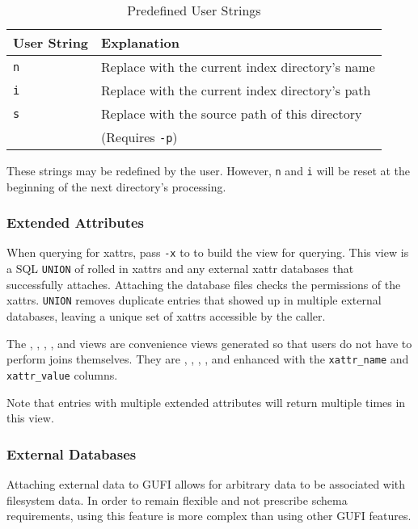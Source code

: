 \begin{table}[H]
  \centering
  \begin{tabular}{|l|l|}
    \hline
    User String & Explanation \\
    \hline
    \texttt{n} & Replace with the current index directory's name \\
    \hline
    \texttt{i} & Replace with the current index directory's path \\
    \hline
    \texttt{s} & Replace with the source path of this directory \\
               & (Requires \texttt{-p}) \\
    \hline
  \end{tabular}
  \caption{Predefined User Strings}
\end{table}

These strings may be redefined by the user. However, \texttt{n} and
\texttt{i} will be reset at the beginning of the next directory's
processing.

\subsubsection{Extended Attributes}
\label{sec:query_xattrs}
When querying for xattrs, pass \texttt{-x} to \gufiquery to build the
\xattrs view for querying. This view is a SQL \texttt{UNION} of rolled
in xattrs and any external xattr databases that successfully
attaches. Attaching the database files checks the permissions of the
xattrs. \texttt{UNION} removes duplicate entries that showed up in
multiple external databases, leaving a unique set of xattrs accessible
by the caller.

The \xentries, \xpentries, \xsummary, \vrxpentries, and \vrxsummary
views are convenience views generated so that users do not have to
perform joins themselves. They are \entries, \pentries, \summary,
\vrpentries, and \vrsummary enhanced with the \texttt{xattr\_name} and
\texttt{xattr\_value} columns.

Note that entries with multiple extended attributes will return
multiple times in this view.

\subsubsection{External Databases}
Attaching external data to GUFI allows for arbitrary data to be
associated with filesystem data. In order to remain flexible and not
prescribe schema requirements, using this feature is more complex than
using other GUFI features.

